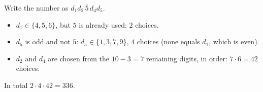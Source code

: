 Write the number as $\overline{d_1d_2\,5\,d_4d_5}$.
\begin{itemize}
\item $d_1\in\{4,5,6\}$, but $5$ is already used: $2$ choices.
\item $d_5$ is odd and not $5$: $d_5\in\{1,3,7,9\}$, $4$ choices (none equals $d_1$, which is even).
\item $d_2$ and $d_4$ are chosen from the $10-3=7$ remaining digits, in order: $7\cdot6=42$ choices.
\end{itemize}
In total $2\cdot4\cdot42=\boxed{336}$.
